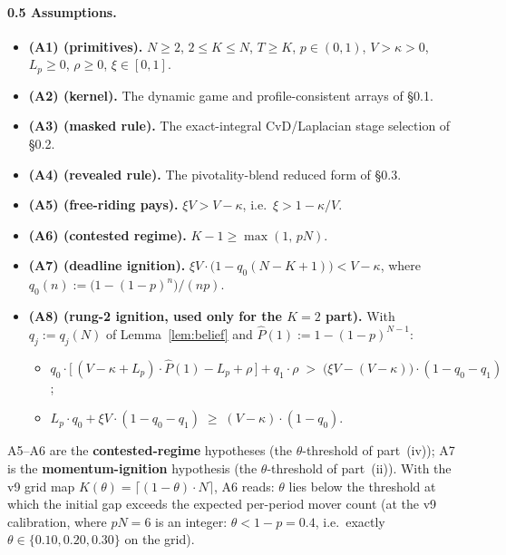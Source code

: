 \paragraph{0.5 Assumptions.}
\begin{itemize}
\item \textbf{(A1) (primitives).} $N \ge 2$, $2 \le K \le N$, $T \ge K$, $p \in (0,1)$, $V > \kappa > 0$, $L_p \ge 0$, $\rho \ge 0$, $\xi \in [0,1]$.
\item \textbf{(A2) (kernel).} The dynamic game and profile-consistent arrays of \S 0.1.
\item \textbf{(A3) (masked rule).} The exact-integral CvD/Laplacian stage selection of \S 0.2.
\item \textbf{(A4) (revealed rule).} The pivotality-blend reduced form of \S 0.3.
\item \textbf{(A5) (free-riding pays).} $\xi V > V - \kappa$, i.e.\ $\xi > 1 - \kappa/V$.
\item \textbf{(A6) (contested regime).} $K - 1 \ge \max(1,\, pN)$.
\item \textbf{(A7) (deadline ignition).} $\xi V \cdot \bigl(1 - q_0(N-K+1)\bigr) < V - \kappa$, where $q_0(n) := \bigl(1 - (1-p)^n\bigr)/(np)$.
\item \textbf{(A8) (rung-2 ignition, used only for the $K = 2$ part).} With $q_j := q_j(N)$ of Lemma~\ref{lem:belief} and $\widehat P(1) := 1 - (1-p)^{N-1}$:
  \begin{itemize}
  \item[\textbf{(C2)}] $q_0 \cdot \bigl[\, (V-\kappa+L_p)\cdot \widehat P(1) - L_p + \rho \,\bigr] + q_1 \cdot \rho \;>\; \bigl(\xi V - (V-\kappa)\bigr)\cdot(1 - q_0 - q_1)$;
  \item[\textbf{(C3)}] $L_p \cdot q_0 + \xi V \cdot (1 - q_0 - q_1) \;\ge\; (V-\kappa)\cdot(1 - q_0)$.
  \end{itemize}
\end{itemize}
A5--A6 are the \textbf{contested-regime} hypotheses (the $\theta$-threshold of part~(iv)); A7 is the \textbf{momentum-ignition} hypothesis (the $\theta$-threshold of part~(ii)). With the v9 grid map $K(\theta) = \lceil (1-\theta)\cdot N \rceil$, A6 reads: $\theta$ lies below the threshold at which the initial gap exceeds the expected per-period mover count (at the v9 calibration, where $pN = 6$ is an integer: $\theta < 1 - p = 0.4$, i.e.\ exactly $\theta \in \{0.10, 0.20, 0.30\}$ on the grid).

